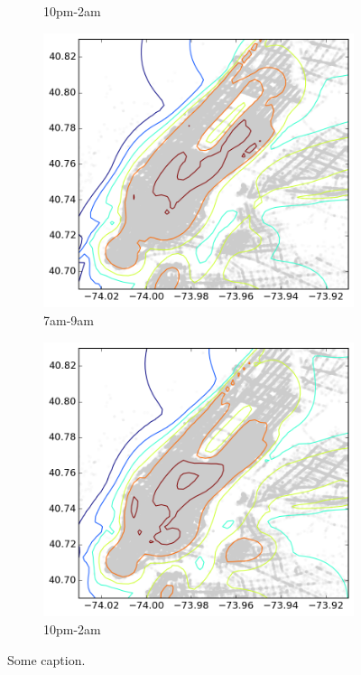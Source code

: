 \documentclass[12pt]{article}
\theoremstyle{definition}
\theoremstyle{algodesc}
\begin{document}
\begin{figure}[htbp]
\begin{subfigure}[t]{.49\linewidth}
    \caption{10pm-2am} \label{fig:dist:night}
  \end{subfigure}
  \begin{subfigure}[t]{.49\linewidth}
    \includegraphics[width=\linewidth]{./include/gmm_cat_morn2.png}
    \caption{7am-9am} \label{fig:dist:morning2}
  \end{subfigure}
  \begin{subfigure}[t]{.49\linewidth}
    \includegraphics[width=\linewidth]{./include/gmm_cat_night2.png}
    \caption{10pm-2am} \label{fig:dist:night2}
  \end{subfigure}
  \caption{Some caption.}
  \label{fig:dist}
\end{figure}
\end{document}
